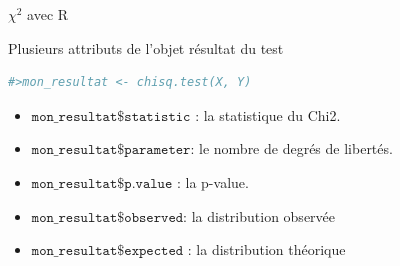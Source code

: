 \documentclass{beamer}
\begin{document}
\begin{frame}[fragile]{$\chi ^2$ avec R }

Plusieurs attributs de l'objet résultat du test 

\vspace{0.6cm}

\begin{scriptsize}
\begin{spacing}{0.75}
\begin{lstlisting}[language=R,basicstyle=\footnotesize\ttfamily, commentstyle=\ttfamily]
#>mon_resultat <- chisq.test(X, Y)
\end{lstlisting}
\end{spacing}
\end{scriptsize}

\vspace{0.6cm}


\begin{itemize}
\item $\texttt{mon\_resultat\$statistic}$ : la statistique du Chi2.
\item $\texttt{mon\_resultat\$parameter}$: le nombre de degrés de libertés.
\item $\texttt{mon\_resultat\$p.value}$ : la p-value.
\item $\texttt{mon\_resultat\$observed}$: la distribution observée
\item $\texttt{mon\_resultat\$expected}$ : la distribution théorique 
\end{itemize}

\end{frame}

\end{document}
